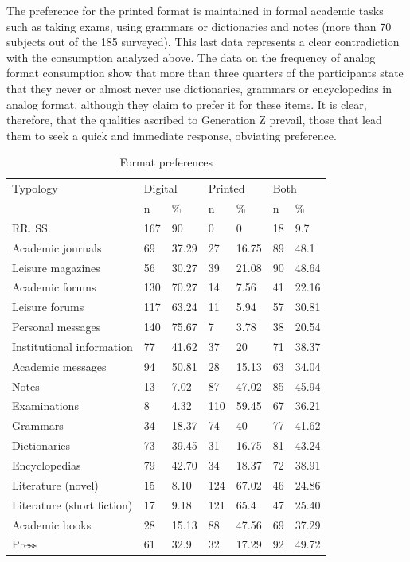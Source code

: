 \documentclass[english]{textolivre}
\begin{document}
The preference for the printed format is maintained in formal academic tasks such as taking exams, using grammars or dictionaries and notes (more than 70 subjects out of the 185 surveyed). This last data represents a clear contradiction with the consumption analyzed above. The data on the frequency of analog format consumption show that more than three quarters of the participants state that they never or almost never use dictionaries, grammars or encyclopedias in analog format, although they claim to prefer it for these items. It is clear, therefore, that the qualities ascribed to Generation Z \cite{perez2016competencia, espiritusanto2016} prevail, those that lead them to seek a quick and immediate response, obviating preference.


\begin{table}[h!]
\centering
\begin{threeparttable}
\caption{Format preferences}
\begin{tabular}{lllllll}
\toprule
Typology & \multicolumn{2}{l}{Digital} & \multicolumn{2}{l}{Printed} & \multicolumn{2}{l}{Both} \\
 & n & \% & n & \% & n & \% \\
\midrule
RR. 			SS. & 167 & 90 & 0 & 0 & 18 & 9.7 \\
Academic 			journals & 69 & 37.29 & 27 & 16.75 & 89 & 48.1 \\
Leisure 			magazines & 56 & 30.27 & 39 & 21.08 & 90 & 48.64 \\
Academic 			forums & 130 & 70.27 & 14 & 7.56 & 41 & 22.16 \\
Leisure 			forums & 117 & 63.24 & 11 & 5.94 & 57 & 30.81 \\
Personal 			messages & 140 & 75.67 & 7 & 3.78 & 38 & 20.54 \\
Institutional 		information & 77 & 41.62 & 37 & 20 & 71 & 38.37 \\
Academic 			messages & 94 & 50.81 & 28 & 15.13 & 63 & 34.04 \\
Notes & 13 & 7.02 & 87 & 47.02 & 85 & 45.94 \\
Examinations & 8 & 4.32 & 110 & 59.45 & 67 & 36.21 \\
Grammars & 34 & 18.37 & 74 & 40 & 77 & 41.62 \\
Dictionaries & 73 & 39.45 & 31 & 16.75 & 81 & 43.24 \\
Encyclopedias & 79 & 42.70 & 34 & 18.37 & 72 & 38.91 \\
Literature 			(novel) & 15 & 8.10 & 124 & 67.02 & 46 & 24.86 \\
Literature 			(short fiction) & 17 & 9.18 & 121 & 65.4 & 47 & 25.40 \\
Academic 			books & 28 & 15.13 & 88 & 47.56 & 69 & 37.29 \\
Press & 61 & 32.9 & 32 & 17.29 & 92 & 49.72 \\
\bottomrule
\end{tabular}
\label{tab08}
\end{threeparttable}
\end{table}
\end{document}
